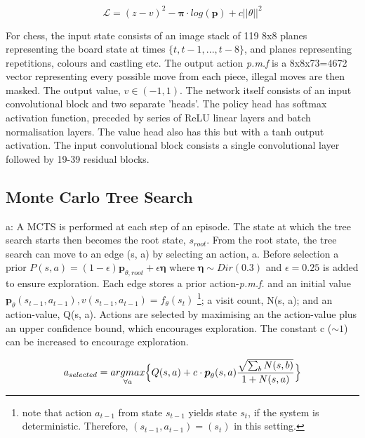 \documentclass[../main.tex]{subfiles}
\begin{document}
\begin{equation}
    \mathcal{L} = (z - v)^2 - \boldsymbol{\pi} \cdot log(\boldsymbol{p}) + c||\theta||^2
   \label{eqn:loss}
\end{equation}

For chess, the input state consists of an image stack of 119 8x8 planes representing the board state at times $ \{ t, t-1, ..., t-8 \} $, and planes representing repetitions, colours and castling etc. The output action \textit{p.m.f} is a 8x8x73=4672 vector representing every possible move from each piece, illegal moves are then masked. The output value, $v \in (-1, 1)$. 
The network itself consists of an input convolutional block and two separate 'heads'. The policy head has softmax activation function, preceded by series of ReLU linear layers and batch normalisation layers. The value head also has this but with a tanh output activation. The input convolutional block consists a single convolutional layer followed by 19-39 residual blocks.

\subsection{Monte Carlo Tree Search}
\label{sec:mctsintro}

a:
A MCTS is performed at each step of an episode. The state at which the tree search starts then becomes the root state, $s_{root}$. From the root state, the tree search can move to an edge (s, a) by selecting an action, a. Before selection a prior $P(s, a) = (1-\epsilon)\boldsymbol{p}_{\theta, root} + \epsilon \boldsymbol{\eta}$ where $\boldsymbol{\eta} \sim Dir(0.3)$ and $\epsilon = 0.25$ is added to ensure exploration. Each edge stores a prior action-\textit{p.m.f.} and an initial value $\boldsymbol{p}_\theta (s_{t-1}, a_{t-1}), v(s_{t-1}, a_{t-1}) =f_\theta(s_t)$ \footnote{note that action $a_{t-1}$ from state $s_{t-1}$ yields state $s_t$, if the system is deterministic. Therefore, $(s_{t-1}, a_{t-1}) = (s_t)$ in this setting.}; a visit count, N(s, a); and an action-value, Q(s, a). Actions are selected by maximising an the action-value plus an upper confidence bound, which encourages exploration. The constant c ($\sim 1$) can be increased to encourage exploration.

\begin{equation}
   a_{selected} = \underset{\forall a}{argmax} \Big{\{}Q(s, a) + c \cdot\boldsymbol{p}_\theta (s, a)\frac{\sqrt{\sum_b N(s, b)}}{1 + N(s, a)}\Big{\}}
   \label{eqn:ucb}
\end{equation}
\end{document}
